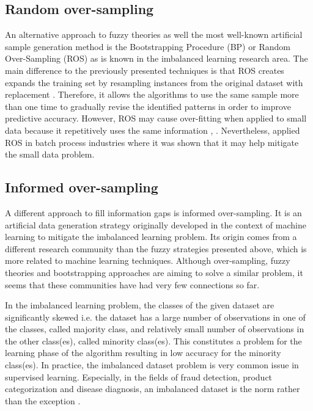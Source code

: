 \documentclass[parskip=full]{scrartcl}
\begin{document}
\subsection{Random over-sampling}

An alternative approach to fuzzy theories as well the most well-known artificial
sample generation method is the Bootstrapping Procedure (BP)
\cite{AbdulLateh.2017} or Random Over-Sampling (ROS) as is known in the
imbalanced learning research area. The main difference to the previously
presented techniques is that ROS creates expands the training set by resampling
instances from the original dataset with replacement \cite{Efron.1993}.
Therefore, it allows the algorithms to use the same sample more than one time to
gradually revise the identified patterns in order to improve predictive
accuracy. However, ROS may cause over-fitting when applied to small data because
it repetitively uses the same information \cite{Tsai.2015}, \cite{Li.2018}.
Nevertheless, \cite{Ivanescu.2006} applied ROS in batch process industries where
it was shown that it may help mitigate the small data problem.

\subsection{Informed over-sampling}

A different approach to fill information gaps is informed over-sampling. It is
an artificial data generation strategy originally developed in the context of
machine learning to mitigate the imbalanced learning problem. Its origin comes
from a different research community than the fuzzy strategies presented above,
which is more related to machine learning techniques. Although over-sampling,
fuzzy theories and bootstrapping approaches are aiming to solve a similar
problem, it seems that these communities have had very few connections so far.

In the imbalanced learning problem, the classes of the given dataset are
significantly skewed i.e. the dataset has a large number of observations in one
of the classes, called majority class, and relatively small number of
observations in the other class(es), called minority class(es). This constitutes
a problem for the learning phase of the algorithm resulting in low accuracy for
the minority class(es). In practice, the imbalanced dataset problem is very
common issue in supervised learning. Especially, in the fields of fraud
detection, product categorization and disease diagnosis, an imbalanced dataset
is the norm rather than the exception \cite{He.2013}.
\end{document}
